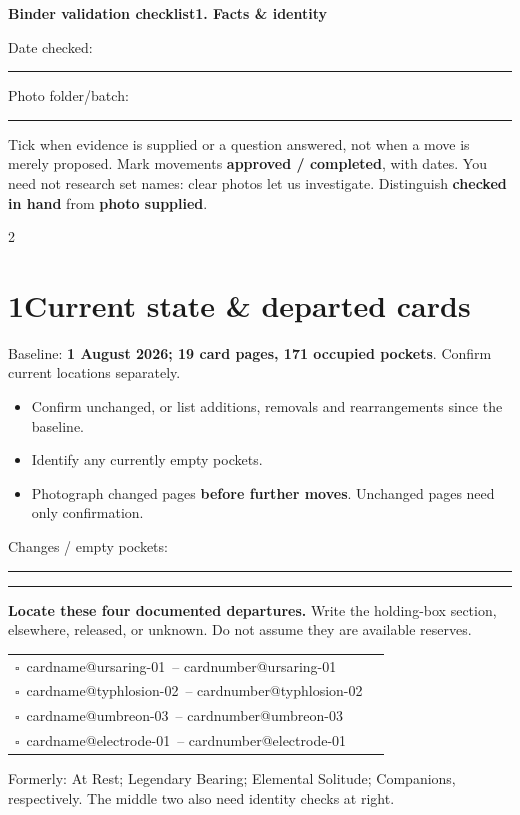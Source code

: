 \documentclass[10pt,a4paper]{article}
\makeatletter
\newcommand{\id}[1]{\csname cardnumber@#1\endcsname}
\newcommand{\card}[1]{\csname cardname@#1\endcsname\ -- \id{#1}}
\newcommand{\boxx}{$\square$}
\newcommand{\blank}{\rule{\linewidth}{0.25pt}}
\newcommand{\smallnote}[1]{{\fontsize{8.5}{10}\selectfont #1\par}}
\makeatother
\begin{document}
\fontsize{9.5}{11.2}\selectfont
{\LARGE\bfseries Binder validation checklist}\hfill{\bfseries 1. Facts \& identity}

Date checked: \rule{29mm}{0.3pt}\quad Photo folder/batch: \rule{67mm}{0.3pt}

\smallnote{Tick when evidence is supplied or a question answered, not when a move is merely proposed. Mark movements \textbf{approved / completed}, with dates. You need not research set names: clear photos let us investigate. Distinguish \textbf{checked in hand} from \textbf{photo supplied}.}
\begin{multicols}{2}
\section{1\quad Current state \& departed cards}
Baseline: \textbf{1 August 2026; 19 card pages, 171 occupied pockets}. Confirm current locations separately.
\begin{itemize}
\item Confirm unchanged, or list additions, removals and rearrangements since the baseline.
\item Identify any currently empty pockets.
\item Photograph changed pages \textbf{before further moves}. Unchanged pages need only confirmation.
\end{itemize}
Changes / empty pockets:\par\blank\par\blank

\textbf{Locate these four documented departures.} Write the holding-box section, elsewhere, released, or unknown. Do not assume they are available reserves.

\begin{tabularx}{\linewidth}{@{}l X@{}}
\boxx\ \card{ursaring-01} & \hrulefill\\
\boxx\ \card{typhlosion-02} & \hrulefill\\
\boxx\ \card{umbreon-03} & \hrulefill\\
\boxx\ \card{electrode-01} & \hrulefill\\
\end{tabularx}
\smallnote{Formerly: At Rest; Legendary Bearing; Elemental Solitude; Companions, respectively. The middle two also need identity checks at right.}


\end{multicols}
\end{document}
